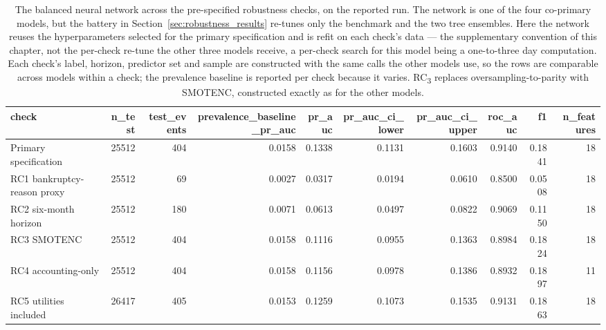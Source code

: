 \begin{table}[htbp]
\centering
\caption{The balanced neural network across the pre-specified robustness checks, on the reported run. The network is one of the four co-primary models, but the battery in Section~\ref{sec:robustness_results} re-tunes only the benchmark and the two tree ensembles. Here the network reuses the hyperparameters selected for the primary specification and is refit on each check's data --- the supplementary convention of this chapter, not the per-check re-tune the other three models receive, a per-check search for this model being a one-to-three day computation. Each check's label, horizon, predictor set and sample are constructed with the same calls the other models use, so the rows are comparable across models within a check; the prevalence baseline is reported per check because it varies. RC\textsubscript{3} replaces oversampling-to-parity with SMOTENC, constructed exactly as for the other models.}
\label{tab:rc_nn_final_primary}
\small
\begin{tabular}{lrrrrrrrrr}
\toprule
check & n\_test & test\_events & prevalence\_baseline\_pr\_auc & pr\_auc & pr\_auc\_ci\_lower & pr\_auc\_ci\_upper & roc\_auc & f1 & n\_features \\
\midrule
Primary specification & 25512 & 404 & 0.0158 & 0.1338 & 0.1131 & 0.1603 & 0.9140 & 0.1841 & 18 \\
RC1 bankruptcy-reason proxy & 25512 & 69 & 0.0027 & 0.0317 & 0.0194 & 0.0610 & 0.8500 & 0.0508 & 18 \\
RC2 six-month horizon & 25512 & 180 & 0.0071 & 0.0613 & 0.0497 & 0.0822 & 0.9069 & 0.1150 & 18 \\
RC3 SMOTENC & 25512 & 404 & 0.0158 & 0.1116 & 0.0955 & 0.1363 & 0.8984 & 0.1824 & 18 \\
RC4 accounting-only & 25512 & 404 & 0.0158 & 0.1156 & 0.0978 & 0.1386 & 0.8932 & 0.1897 & 11 \\
RC5 utilities included & 26417 & 405 & 0.0153 & 0.1259 & 0.1073 & 0.1535 & 0.9131 & 0.1863 & 18 \\
\bottomrule
\end{tabular}
\end{table}
